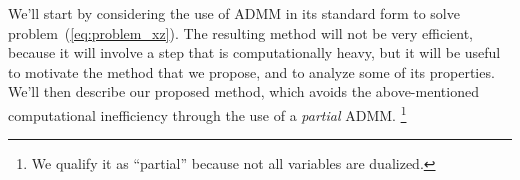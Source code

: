 \documentclass[10pt,twocolumn,twoside]{IEEEtran}
\newcommand{\x}{\mathbf{x}} %
\newcommand{\z}{\mathbf{z}} %
\newcommand{\D}{\mathbf{D}} %
\begin{document}
%


We'll start by considering the use of ADMM in its standard form to solve problem~(\ref{eq:problem_xz}). The resulting method will not be very efficient, because it will involve a step that is computationally heavy, but it will be useful to motivate the method that we propose, and to analyze some of its properties. We'll then describe our proposed method, which avoids the above-mentioned computational inefficiency through the use of a \emph{partial} ADMM.%
\footnote{We qualify it as ``partial'' because not all variables are dualized.}
\end{document}
